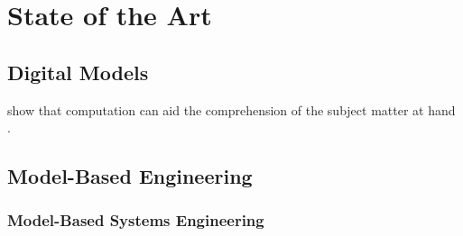 \chapter{State of the Art}
\label{sec:state-of-the-art}

\section{Digital Models}
\label{sec:digital-models}
\autocite{hinsen_computational_2014}
\autocite{hinsen_scientific_2016}
\citeauthor{sussman_role_2002} show that computation can aid the comprehension of the subject matter at hand \autocite{sussman_role_2002}.

\section{Model-Based Engineering}
\label{sec:model-based-engineering}

\subsection{Model-Based Systems Engineering}
\label{sec:model-based-systems-engineering}

